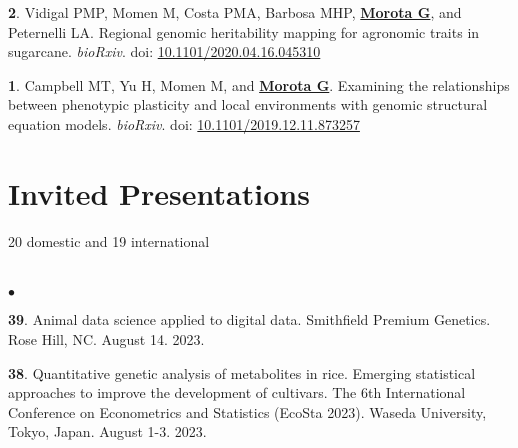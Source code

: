 \documentclass[margin,line,10pt]{res}
\newenvironment{list1}{
  \begin{list}{\ding{113}}{%
      \setlength{\itemsep}{0in}
      \setlength{\parsep}{0in} \setlength{\parskip}{0in}
      \setlength{\topsep}{0in} \setlength{\partopsep}{0in} 
      \setlength{\leftmargin}{0.17in}}}{\end{list}}
\newenvironment{list2}{
  \begin{list}{$\bullet$}{%
      \setlength{\itemsep}{0in}
      \setlength{\parsep}{0in} \setlength{\parskip}{0in}
      \setlength{\topsep}{0in} \setlength{\partopsep}{0in} 
      \setlength{\leftmargin}{0.2in}}}{\end{list}}
\begin{document}
\begin{resume}
\begin{list1}

  \item [{\bf 2}.] Vidigal PMP, Momen M, Costa PMA, Barbosa MHP, \textbf{\underline{Morota G}}, and Peternelli LA. Regional genomic heritability mapping for agronomic traits in sugarcane. \emph{bioRxiv}. doi: \textcolor{blue}{\href{https://doi.org/10.1101/2020.04.16.045310}{10.1101/2020.04.16.045310}}

  \vspace{0.5cm}

\item [{\bf 1}.] Campbell MT, Yu H, Momen M, and \textbf{\underline{Morota G}}. Examining the relationships between phenotypic plasticity and local environments with genomic structural equation models. \emph{bioRxiv}. doi: \textcolor{blue}{\href{https://doi.org/10.1101/2019.12.11.873257}{10.1101/2019.12.11.873257}}
  

\end{list1}




\vspace{1.0cm}
\section{\sc Invited Presentations}
\vspace{0.5cm}
20 domestic and 19 international \\
\noindent


\section{}
\begin{list2}

  \item [{\bf 39}.] Animal data science applied to digital data. Smithfield Premium Genetics. Rose Hill, NC. August 14. 2023. 

  \vspace{0.5cm}

  \item [{\bf 38}.] Quantitative genetic analysis of metabolites in rice. Emerging statistical approaches to improve the development of cultivars. The 6th International Conference on Econometrics and Statistics (EcoSta 2023). Waseda University, Tokyo, Japan. August 1-3. 2023.


\end{list2}
\end{resume}
\end{document}

